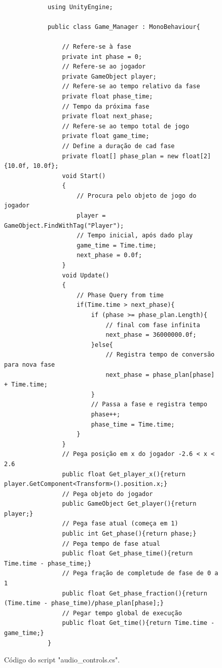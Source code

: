 \begin{figure}[ht!]
        \centering
        \begin{lstlisting}

            using UnityEngine;

            public class Game_Manager : MonoBehaviour{

                // Refere-se à fase
                private int phase = 0;
                // Refere-se ao jogador
                private GameObject player;
                // Refere-se ao tempo relativo da fase
                private float phase_time;
                // Tempo da próxima fase
                private float next_phase;
                // Refere-se ao tempo total de jogo
                private float game_time;
                // Define a duração de cad fase
                private float[] phase_plan = new float[2]{10.0f, 10.0f};
                void Start()
                {
                    // Procura pelo objeto de jogo do jogador
                    player = GameObject.FindWithTag("Player");
                    // Tempo inicial, após dado play
                    game_time = Time.time;
                    next_phase = 0.0f;
                }
                void Update()
                {
                    // Phase Query from time
                    if(Time.time > next_phase){
                        if (phase >= phase_plan.Length){
                            // final com fase infinita
                            next_phase = 36000000.0f;
                        }else{
                            // Registra tempo de conversão para nova fase
                            next_phase = phase_plan[phase] + Time.time;
                        }
                        // Passa a fase e registra tempo
                        phase++;
                        phase_time = Time.time;
                    }
                }
                // Pega posição em x do jogador -2.6 < x < 2.6
                public float Get_player_x(){return player.GetComponent<Transform>().position.x;}
                // Pega objeto do jogador
                public GameObject Get_player(){return player;}
                // Pega fase atual (começa em 1)
                public int Get_phase(){return phase;}
                // Pega tempo de fase atual
                public float Get_phase_time(){return Time.time - phase_time;}
                // Pega fração de completude de fase de 0 a 1
                public float Get_phase_fraction(){return (Time.time - phase_time)/phase_plan[phase];}
                // Pegar tempo global de execução
                public float Get_time(){return Time.time - game_time;}
            }
        \end{lstlisting}
        \label{volume_code}
        \caption{Código do script "audio\_controls.cs".}

    \end{figure}








